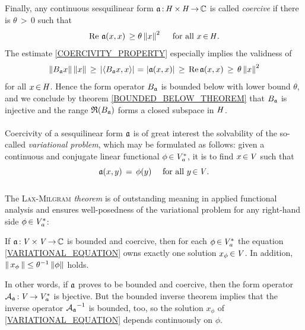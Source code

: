 \documentclass[11pt,twoside]{article}
\begin{document}
\subparagraph{} %
Finally,
any continuous sesquilinear form $\mathfrak{a} {\,:\,} \mathit{H} {\,\times\,} \mathit{H} {\,\to\,} {\mathbb{C}}$
is called \textit{coercive}
if there is $\theta {\,>\,} 0$ such that
\begin{equation}\label{COERCIVITY_PROPERTY}
\operatorname{Re} \, \mathfrak{a}(x,x) \, \geq \theta \left\lVert x \right\rVert^2
\quad \mbox{ for all } x {\,\in\,} \mathit{H}.
\end{equation}
The estimate \eqref{COERCIVITY_PROPERTY} especially implies the validness of
\[
\norm{\linB_{\sql} x}\norm{x}    \, \geq \,
\abs{\scalar{\linB_{\sql} x}{x}} \, \eq  \,
\abs{\sql(x,x)}                  \, \geq \,
\re \sql(x,x)                    \, \geq \,
\theta \norm{x}^2
\]
for all $x {\,\in\,} \mathit{H}$.
Hence the form operator ${B}_{\mathfrak{a}}$ is bounded below
with lower bound $\theta$,
and we conclude by theorem \ref{BOUNDED_BELOW_THEOREM}
that ${B}_{\mathfrak{a}}$ is injective and the range $\mathfrak{R}({B}_{\mathfrak{a}})$
forms a closed subspace in $\mathit{H}$.

\paragraph{} %
Coercivity of a sesquilinear form $\mathfrak{a}$ is of great interest {\wrt}
the solvability of the so-called \textit{variational problem},
which may be formulated as follows:
given a continuous and conjugate linear functional $\phi {\,\in\,} \mathit{V}_a^*$,
it is to find $x {\,\in\,} \mathit{V}$ such that
\begin{equation}\label{VARIATIONAL_EQUATION}
\mathfrak{a}(x,y) \,=\, \phi(y) \quad \mbox{ for all } y {\,\in\,} \mathit{V}.
\end{equation}

\subparagraph{} %
The \textsc{Lax-Milgram} \textit{theorem} is of outstanding meaning
in applied functional analysis
and ensures well-posedness of the variational problem
for any right-hand side $\phi {\,\in\,} \mathit{V}_a^*$:

\begin{theorem1}\label{LAX-MILGRAM_THEOREM}
If $\mathfrak{a} {\,:\,} \mathit{V} {\,\times\,} \mathit{V} {\,\to\,} {\mathbb{C}}$ is bounded and coercive,
then for each $\phi {\,\in\,} \mathit{V}_a^*$
the equation \eqref{VARIATIONAL_EQUATION} owns exactly
one solution $x_{\phi} {\,\in\,} \mathit{V}$.
In addition,
$\left\lVert \,x_{\phi}\, \right\rVert \leq \theta^{-1} \left\lVert \phi \right\rVert$ holds.
\end{theorem1}

In other words,
if $\mathfrak{a}$ proves to be bounded and coercive,
then the form operator ${{\mathcal{A}}_{\mathfrak{a}}} {\,:\,} \mathit{V} {\,\to\,} \mathit{V}_a^*$ is bjective.
But the {bounded inverse theorem} implies
that the inverse operator ${{\mathcal{A}}_{\mathfrak{a}}}^{-1}$ is bounded,
too,
so the solution $x_{\phi}$ of \eqref{VARIATIONAL_EQUATION}
depends continuously on $\phi$.
\end{document}
